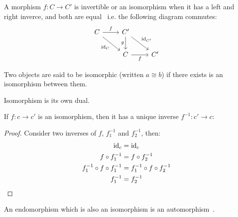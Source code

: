 
\begin{definition}
  A morphism $f: C\to C'$ is invertible or an isomorphism when it has a left and
  right inverce, and both are
  equal~\parencite[p.~19]{lane:working_mathematician} i.e. the following diagram
  commutes:
  \[\begin{tikzcd}[ampersand replacement=\&]
    C \& {C'} \\
    \& C \& {C'}
    \arrow["f"', from=2-2, to=2-3]
    \arrow["g"', from=1-2, to=2-2]
    \arrow["{\id_{C'}}", from=1-2, to=2-3]
    \arrow["f", from=1-1, to=1-2]
    \arrow["{\id_C}"', from=1-1, to=2-2]
  \end{tikzcd}\]
\end{definition}

\begin{remark}
  Two objects are said to be isomorphic (written $a\cong b$) if there exists is
  an isomorphism between them.
\end{remark}

\begin{remark}
  Isomorphism is its own dual.
\end{remark}

\begin{theorem}
  If $f: c\to c'$ is an isomorphism, then it has a unique inverse $f^{-1}:c'\to
  c$:
  \begin{proof}
    Consider two inverses of $f$, $f^{-1}_1$ and $f^{-1}_2$, then:
    \[
      \begin{aligned}
        \mathrm{id}_c &= \mathrm{id}_c\\
        f\circ f^{-1}_1 &= f\circ f^{-1}_2\\
        f^{-1}_1 \circ f \circ f^{-1}_1 &= f^{-1}_1 \circ f \circ f^{-1}_2\\
        f^{-1}_1 &= f^{-1}_2
      \end{aligned}
    \]
  \end{proof}
\end{theorem}

\begin{definition}
  An endomorphism which is also an isomorphism is an
  automorphism~\parencite[p.~7]{riehl:category_theory_in_context}.
\end{definition}

